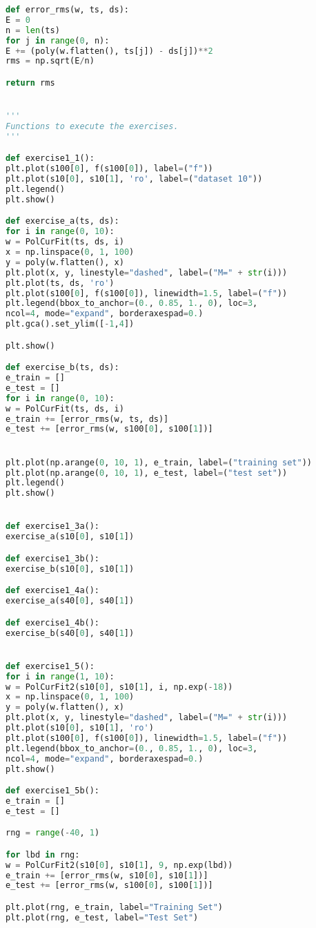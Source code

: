\documentclass{article}
\begin{document}
\begin{lstlisting}[language=python]
def error_rms(w, ts, ds):
E = 0
n = len(ts)
for j in range(0, n):
E += (poly(w.flatten(), ts[j]) - ds[j])**2
rms = np.sqrt(E/n)

return rms


'''
Functions to execute the exercises.
'''

def exercise1_1():
plt.plot(s100[0], f(s100[0]), label=("f"))
plt.plot(s10[0], s10[1], 'ro', label=("dataset 10"))
plt.legend()
plt.show()

def exercise_a(ts, ds):
for i in range(0, 10):
w = PolCurFit(ts, ds, i)
x = np.linspace(0, 1, 100)
y = poly(w.flatten(), x)
plt.plot(x, y, linestyle="dashed", label=("M=" + str(i)))
plt.plot(ts, ds, 'ro')
plt.plot(s100[0], f(s100[0]), linewidth=1.5, label=("f"))
plt.legend(bbox_to_anchor=(0., 0.85, 1., 0), loc=3,
ncol=4, mode="expand", borderaxespad=0.)
plt.gca().set_ylim([-1,4])

plt.show()

def exercise_b(ts, ds):
e_train = []
e_test = []
for i in range(0, 10):
w = PolCurFit(ts, ds, i)
e_train += [error_rms(w, ts, ds)]
e_test += [error_rms(w, s100[0], s100[1])]


plt.plot(np.arange(0, 10, 1), e_train, label=("training set"))
plt.plot(np.arange(0, 10, 1), e_test, label=("test set"))
plt.legend()
plt.show()


def exercise1_3a():
exercise_a(s10[0], s10[1])

def exercise1_3b():
exercise_b(s10[0], s10[1])

def exercise1_4a():    
exercise_a(s40[0], s40[1])

def exercise1_4b():
exercise_b(s40[0], s40[1])


def exercise1_5():
for i in range(1, 10):
w = PolCurFit2(s10[0], s10[1], i, np.exp(-18))
x = np.linspace(0, 1, 100)
y = poly(w.flatten(), x)
plt.plot(x, y, linestyle="dashed", label=("M=" + str(i)))
plt.plot(s10[0], s10[1], 'ro')
plt.plot(s100[0], f(s100[0]), linewidth=1.5, label=("f"))
plt.legend(bbox_to_anchor=(0., 0.85, 1., 0), loc=3,
ncol=4, mode="expand", borderaxespad=0.)
plt.show()

def exercise1_5b():
e_train = []
e_test = []

rng = range(-40, 1)

for lbd in rng:
w = PolCurFit2(s10[0], s10[1], 9, np.exp(lbd))
e_train += [error_rms(w, s10[0], s10[1])]
e_test += [error_rms(w, s100[0], s100[1])]

plt.plot(rng, e_train, label="Training Set")
plt.plot(rng, e_test, label="Test Set")


\end{lstlisting}
\end{document}
